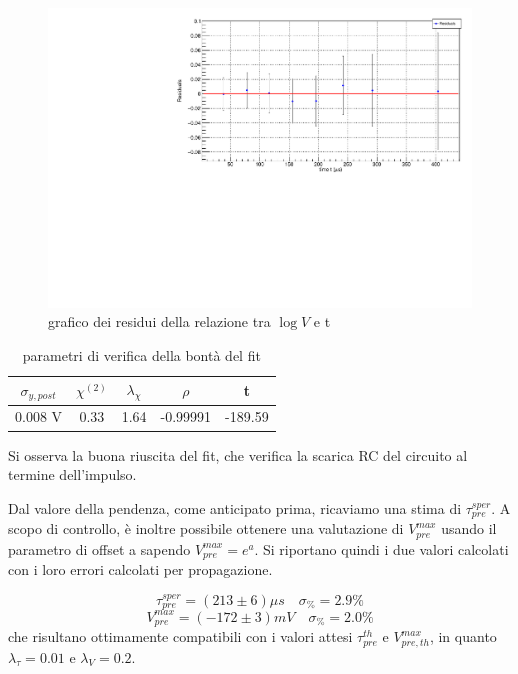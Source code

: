 \documentclass{article}
\begin{document}
\begin{center}
\begin{figure}[H]
\centering
\includegraphics[scale=0.4, angle=0]{preampRCresidui.pdf}
\caption{grafico dei residui della relazione tra $\log V$ e t}
\label{fig:QinvsVpre}
\end{figure}
\end{center}

\begin{table}[ht]
    \centering
    \begin{tabular}{ccccc}
        \toprule
        $\sigma_{y, post}$    &$\chi^{(2)}$    &$\lambda_{\chi}$   &$\rho$  &t   \\
        \midrule
        0.008 V               &0.33            &1.64              &-0.99991&-189.59\\
        \bottomrule
    \end{tabular}
    \caption{parametri di verifica della bontà del fit}
\end{table}

Si osserva la buona riuscita del fit, che verifica la scarica RC del circuito al termine dell'impulso.

Dal valore della pendenza, come anticipato prima, ricaviamo una stima di $\tau_{pre}^{sper}$. A scopo di controllo, è inoltre possibile 
ottenere una valutazione di $V_{pre}^{max}$ usando il parametro di offset a sapendo $V_{pre}^{max} = e^a$. Si riportano quindi i due
valori calcolati con i loro errori calcolati per propagazione.

\[\tau_{pre}^{sper} = (213 \pm 6)\mu s \quad \sigma_{\%} = 2.9 \%    \]
\[V_{pre}^{max} = (-172 \pm 3)mV \quad \sigma_{\%} = 2.0 \%\]
che risultano ottimamente compatibili con i valori attesi  $\tau_{pre}^{th}$ e $V_{pre,th}^{max}$, in quanto $\lambda_{\tau} = 0.01$
e $\lambda_{V}=0.2$.
\end{document}

